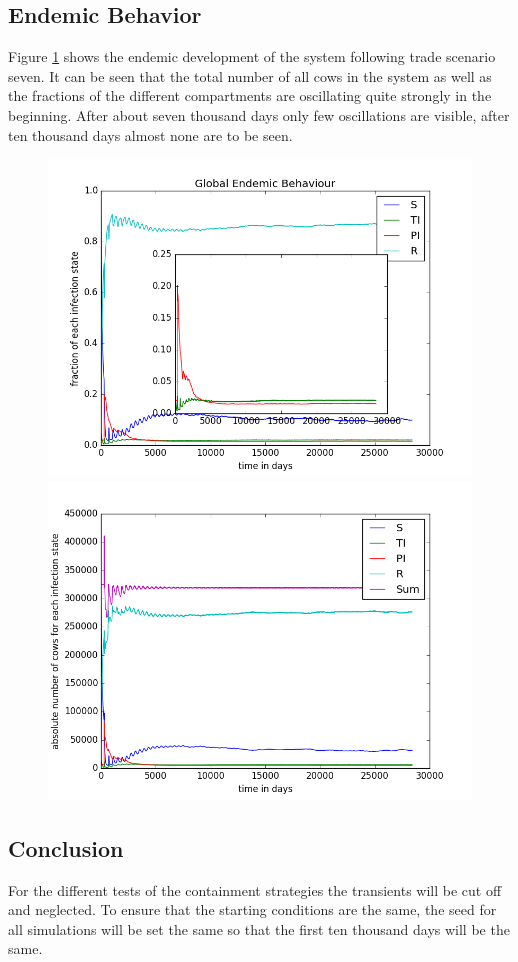 \subsection{Endemic Behavior}
Figure \ref{fig:endemicTransients} shows the endemic development of the system following trade scenario seven. It can be seen that the total number of all cows in the system as well as the fractions of the different compartments are oscillating quite strongly in the beginning. After about seven thousand days only few oscillations are visible, after ten thousand days almost none are to be seen.
\begin{figure}[htbp]
\begin{minipage}{0.5\textwidth}
\centering
\noindent\includegraphics[width=0.9\linewidth,height=\textheight,
keepaspectratio]{scen7endemicFractions.png} 
\end{minipage}
\begin{minipage}{0.5\textwidth}
\centering
\noindent\includegraphics[width=0.9\linewidth,height=\textheight,
keepaspectratio]{scen7totalEndemicNumbers.png} 
\end{minipage}
\caption[Endemic Transients]{}
\label{fig:endemicTransients}
\end{figure} 


\subsection{Conclusion}
For the different tests of the containment strategies the transients will be cut off and neglected. To ensure that the starting conditions are the same, the seed for all simulations will be set the same so that the first ten thousand days will be the same.